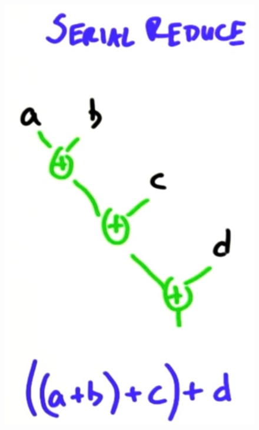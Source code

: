 \begin{figure}[H]
	\centering
	\begin{minipage}{.4\textwidth}
		\centering
		\includegraphics[width=0.8\linewidth]{figs/aggregation/seqReduce}
		\label{seqReduce}
	\end{minipage}
	\begin{minipage}{.4\textwidth}
		\centering

\end{minipage}
\end{figure}
